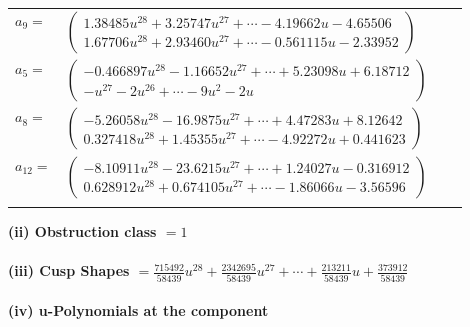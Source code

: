 \documentclass[1p]{elsarticle_modified}
\theoremstyle{definition}
\begin{document}
\begin{tabular}{m{7pt} m{180pt} m{7pt} m{180pt} }
\flushright $a_{9}=$&$\begin{pmatrix}1.38485 u^{28}+3.25747 u^{27}+\cdots-4.19662 u-4.65506\\1.67706 u^{28}+2.93460 u^{27}+\cdots-0.561115 u-2.33952\end{pmatrix}$ \\
\flushright $a_{5}=$&$\begin{pmatrix}-0.466897 u^{28}-1.16652 u^{27}+\cdots+5.23098 u+6.18712\\- u^{27}-2 u^{26}+\cdots-9 u^2-2 u\end{pmatrix}$ \\
\flushright $a_{8}=$&$\begin{pmatrix}-5.26058 u^{28}-16.9875 u^{27}+\cdots+4.47283 u+8.12642\\0.327418 u^{28}+1.45355 u^{27}+\cdots-4.92272 u+0.441623\end{pmatrix}$ \\
\flushright $a_{12}=$&$\begin{pmatrix}-8.10911 u^{28}-23.6215 u^{27}+\cdots+1.24027 u-0.316912\\0.628912 u^{28}+0.674105 u^{27}+\cdots-1.86066 u-3.56596\end{pmatrix}$\\&\end{tabular}
\flushleft \textbf{(ii) Obstruction class $= 1$}\\~\\
\flushleft \textbf{(iii) Cusp Shapes $= \frac{715492}{58439} u^{28}+\frac{2342695}{58439} u^{27}+\cdots+\frac{213211}{58439} u+\frac{373912}{58439}$}\\~\\
\newpage\renewcommand{\arraystretch}{1}
\flushleft \textbf{(iv) u-Polynomials at the component}\newline \\
\end{document}
